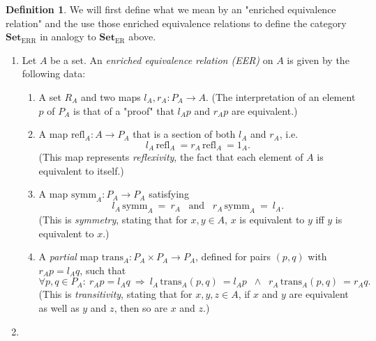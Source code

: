 \documentclass[12pt,a4paper,twoside]{article}
\def\Set{{\mathbf{Set}}}
\def\SetER{{\Set_{\text{ER}}}}
\def\SetEER{{\Set_{\text{ERR}}}}
\def\refl{{\text{refl}}}
\def\symm{{\text{symm}}}
\def\trans{{\text{trans}}}
\theoremstyle{definition}
\newtheorem{defi}{Definition}[section]
\begin{document}
\begin{defi}\label{defEERSetEER}
    We will first define what we mean by an "enriched equivalence relation"
    and the use those enriched equivalence relations to define the category
    $\SetEER$ in analogy to $\SetER$ above.
    \begin{enumerate}
        \item\label{defEER}
            Let $A$ be a set. An \emph{enriched equivalence relation (EER)} on $A$
            is given by the following data:
            \begin{enumerate}
                \item
                    A set $R_A$ and two maps $l_A,r_A:P_A\rightarrow A$.
                    (The interpretation of an element $p$ of $P_A$ is that of a
                    "proof" that $l_Ap$ and $r_Ap$ are equivalent.)
                \item
                    A map $\refl_A:A\rightarrow P_A$ that is a section of
                    both $l_A$ and $r_A$, i.e.
                    \[
                        l_A\,\refl_A\ =r_A\,\refl_A\ =1_A.
                    \]
                    (This map represents \emph{reflexivity}, the fact that
                    each element of $A$ is equivalent to itself.)
                \item
                    A map $\symm_A:P_A\rightarrow P_A$ satisfying
                    \[
                        l_A\,\symm_A\ =\ r_A
                        \;\;\;\text{and}\;\;\;
                        r_A\,\symm_A\ =\ l_A.
                    \]
                    (This is \emph{symmetry}, stating that for $x,y\in A$,
                    $x$ is equivalent to $y$ iff $y$ is equivalent to $x$.)
                \item
                    A \emph{partial} map $\trans_A:P_A\times P_A\rightarrow P_A$,
                    defined for pairs $(p,q)$ with $r_Ap=l_Aq$, such that
                    \[
                        \forall p,q\in P_A:\ r_Ap=l_Aq\
                        \Rightarrow\
                        l_A\,\trans_A(p,q)\ = l_Ap
                        \;\;\wedge\;\;
                        r_A\,\trans_A(p,q)\ = r_Aq.
                    \]
                    (This is \emph{transitivity}, stating that for $x,y,z\in A$,
                    if $x$ and $y$ are equivalent as well as $y$ and $z$, then
                    so are $x$ and $z$.)
            \end{enumerate}
        \item\label{defSetEER}

\end{enumerate}
\end{defi}
\end{document}
